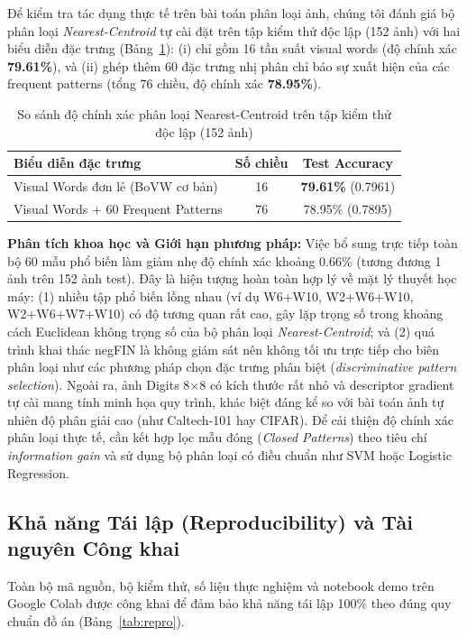 \documentclass[conference]{IEEEtran}
\begin{document}
Để kiểm tra tác dụng thực tế trên bài toán phân loại ảnh, chúng tôi đánh giá bộ phân loại \textit{Nearest-Centroid} tự cài đặt trên tập kiểm thử độc lập (152 ảnh) với hai biểu diễn đặc trưng (Bảng~\ref{tab:ch3_acc}): (i) chỉ gồm 16 tần suất visual words (độ chính xác \textbf{79.61\%}), và (ii) ghép thêm 60 đặc trưng nhị phân chỉ báo sự xuất hiện của các frequent patterns (tổng 76 chiều, độ chính xác \textbf{78.95\%}).

\begin{table}[H]
\caption{So sánh độ chính xác phân loại Nearest-Centroid trên tập kiểm thử độc lập (152 ảnh)}
\label{tab:ch3_acc}
\centering
\begin{tabular}{@{}lcc@{}}
\toprule
\textbf{Biểu diễn đặc trưng} & \textbf{Số chiều} & \textbf{Test Accuracy} \\
\midrule
Visual Words đơn lẻ (BoVW cơ bản) & 16 & \textbf{79.61\%} (0.7961) \\
Visual Words + 60 Frequent Patterns & 76 & 78.95\% (0.7895) \\
\bottomrule
\end{tabular}
\end{table}

\textbf{Phân tích khoa học và Giới hạn phương pháp:} Việc bổ sung trực tiếp toàn bộ 60 mẫu phổ biến làm giảm nhẹ độ chính xác khoảng 0.66\% (tương đương 1 ảnh trên 152 ảnh test). Đây là hiện tượng hoàn toàn hợp lý về mặt lý thuyết học máy: (1) nhiều tập phổ biến lồng nhau (ví dụ W6+W10, W2+W6+W10, W2+W6+W7+W10) có độ tương quan rất cao, gây lặp trọng số trong khoảng cách Euclidean không trọng số của bộ phân loại \textit{Nearest-Centroid}; và (2) quá trình khai thác negFIN là không giám sát nên không tối ưu trực tiếp cho biên phân loại như các phương pháp chọn đặc trưng phân biệt (\textit{discriminative pattern selection}). Ngoài ra, ảnh Digits 8$\times$8 có kích thước rất nhỏ và descriptor gradient tự cài mang tính minh họa quy trình, khác biệt đáng kể so với bài toán ảnh tự nhiên độ phân giải cao (như Caltech-101 hay CIFAR). Để cải thiện độ chính xác phân loại thực tế, cần kết hợp lọc mẫu đóng (\textit{Closed Patterns}) theo tiêu chí \textit{information gain} và sử dụng bộ phân loại có điều chuẩn như SVM hoặc Logistic Regression.

\subsection{Khả năng Tái lập (Reproducibility) và Tài nguyên Công khai}
Toàn bộ mã nguồn, bộ kiểm thử, số liệu thực nghiệm và notebook demo trên Google Colab được công khai để đảm bảo khả năng tái lập 100\% theo đúng quy chuẩn đồ án (Bảng~\ref{tab:repro}).
\end{document}

